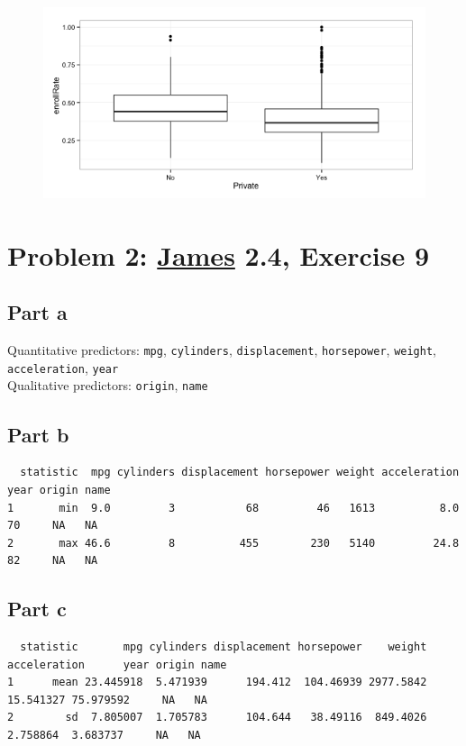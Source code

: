 \documentclass[11pt]{article}
\begin{document}
\begin{figure}[H]
	\centering
	\includegraphics[width=5.5in]{8cvi_enrollRate_boxplots.png}
\end{figure}



\section*{Problem 2: \href{http://www-bcf.usc.edu/~gareth/ISL/}{James} 2.4, Exercise 9}

\subsection*{Part a}
Quantitative predictors: \texttt{mpg}, \texttt{cylinders}, \texttt{displacement}, \texttt{horsepower}, \texttt{weight}, \texttt{acceleration}, \texttt{year}\\
Qualitative predictors: \texttt{origin}, \texttt{name}

\subsection*{Part b}
\begin{verbatim}
  statistic  mpg cylinders displacement horsepower weight acceleration year origin name
1       min  9.0         3           68         46   1613          8.0   70     NA   NA
2       max 46.6         8          455        230   5140         24.8   82     NA   NA
\end{verbatim}

\subsection*{Part c}

\begin{verbatim}
  statistic       mpg cylinders displacement horsepower    weight acceleration      year origin name
1      mean 23.445918  5.471939      194.412  104.46939 2977.5842    15.541327 75.979592     NA   NA
2        sd  7.805007  1.705783      104.644   38.49116  849.4026     2.758864  3.683737     NA   NA
\end{verbatim}
\end{document}
